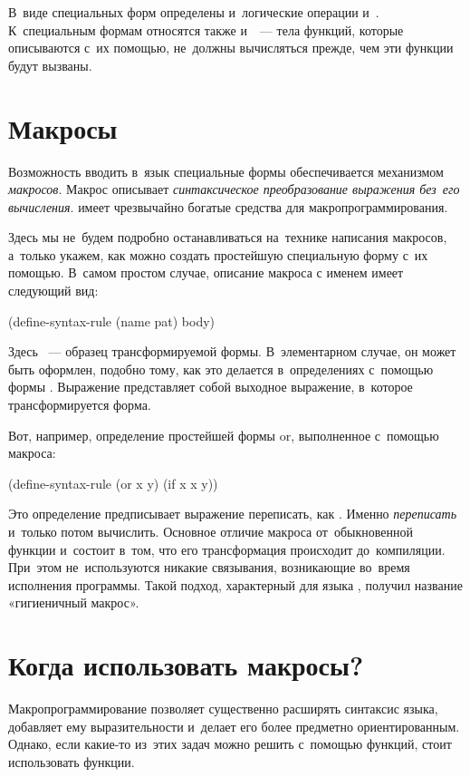В~виде специальных форм определены и~логические операции  и~. К~специальным формам относятся также  и~~--- тела функций, которые описываются с~их помощью, не~должны вычисляться прежде, чем эти функции будут вызваны.


\section[2]{Макросы}\label{macro}%
Возможность вводить в~язык \Scheme специальные формы обеспечивается механизмом \emph{макросов}. Макрос описывает \emph{синтаксическое преобразование выражения без~его вычисления}. \Scheme имеет чрезвычайно богатые средства для макропрограммирования.  

Здесь мы не~будем подробно останавливаться на~технике написания макросов, а~только укажем, как можно создать простейшую специальную форму с~их помощью. В~самом простом случае, описание макроса с именем  имеет следующий вид:

\begin{Specification}[emph={name,pat}]
(define-syntax-rule (name pat)
    body)
\end{Specification}

\noindent Здесь ~--- образец трансформируемой формы. В~элементарном случае, он может быть оформлен, подобно тому, как это делается в~определениях с~помощью формы . Выражение  представляет собой выходное выражение, в~которое трансформируется форма.

Вот, например, определение простейшей формы \si{or}, выполненное с~помощью макроса:

\begin{Definition}[emph={x,y}]
(define-syntax-rule (or x y)
  (if x x y))
\end{Definition}

Это определение предписывает выражение  переписать, как . Именно \emph{переписать} и~только потом вычислить. Основное отличие макроса от~обыкновенной функции и~состоит в~том, что его трансформация происходит до~компиляции. При~этом не~используются никакие связывания, возникающие во~время исполнения программы. Такой подход, характерный для языка , получил название «гигиеничный макрос».

\section{Когда использовать макросы?}%
Макропрограммирование позволяет существенно расширять синтаксис языка, добавляет ему выразительности и~делает его более предметно ориентированным. Однако, если какие-то из~этих задач можно решить с~помощью функций, стоит использовать функции.

